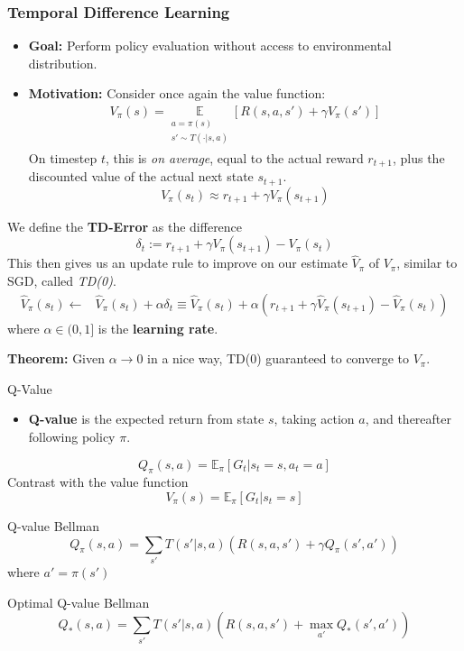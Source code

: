 \documentclass[10pt,a4paper]{beamer}
\begin{document}
\begin{frame}
\frametitle{Temporal Difference Learning}

\begin{itemize}
	\item \textbf{Goal:} Perform policy evaluation without access to environmental
	distribution.
	\pause
	\item \textbf{Motivation:} Consider once again the value function:
	\begin{align*}
		V_\pi(s) = 
		\underset{\substack{a = \pi(s) \\ s' \sim T(\cdot | s, a)}}{\mathbb{E}} \left[ R(s,a,s') + \gamma V_\pi(s') \right] 
	\end{align*}
\pause
	On timestep $t$, this is \textit{on average}, equal to the actual reward $r_{t+1}$, plus the discounted value of the actual next state $s_{t+1}$.
	$$
	V_{\pi}(s_t) \approx r_{t+1} + \gamma V_{\pi}(s_{t+1})
	$$
	\pause
\end{itemize}
\vspace{-0.5cm}
We define the \textbf{TD-Error} as the difference 
$$
\delta_t := r_{t+1} + \gamma V_\pi(s_{t+1}) - V_\pi(s_t)
$$
\pause
This then gives us an update rule to improve on our estimate $\hat{V}_\pi$ 
of $V_\pi$,
similar to SGD, called \textit{TD(0)}.
\begin{align*}
\hat{V}_\pi(s_t)  \leftarrow &\hat{V}_\pi(s_t) + \alpha \delta_t  
 \equiv \hat{V}_\pi(s_t) + \alpha \left( r_{t+1} + \gamma \hat{V}_\pi(s_{t+1}) - \hat{V}_\pi(s_t) \right) 
\end{align*}
where $\alpha \in (0,1]$ is the \textbf{learning rate}.

\textbf{Theorem:} Given $\alpha \to 0$ in a nice way, 
TD(0) guaranteed to converge to $V_\pi$. 

\end{frame}

\begin{frame}{Q-Value}
	\begin{itemize}
		\item \textbf{Q-value} is the expected return
		from state $s$, taking action $a$, and thereafter following policy $\pi$. 
	\end{itemize}
$$
Q_\pi(s,a)	= \mathbb{E}_\pi [G_t  | s_t =  s, a_t = a]
$$
\pause
Contrast with the value function
$$
V_\pi(s)= \mathbb{E}_\pi [G_t  | s_t =  s]
$$
\pause
\begin{block}{Q-value Bellman}
	$$
	Q_\pi(s,a) = \sum_{s'} T(s' | s, a) \left( R(s,a,s') + \gamma Q_\pi(s', a') \right)
	$$
	where $a' = \pi(s')$
\end{block}
\begin{block}{Optimal Q-value Bellman}
	$$
	Q_*(s,a) = \sum_{s'} T(s' | s, a) \left( R(s,a,s') + \max_{a'} Q_*(s', a') 
	\right)
	$$
\end{block}
\end{frame}
\end{document}
